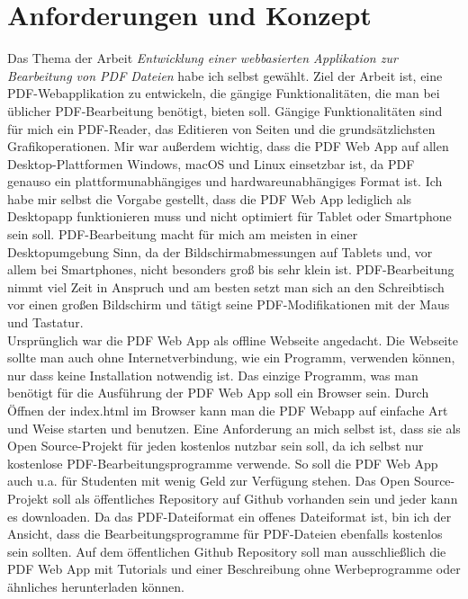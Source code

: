 \chapter{Anforderungen und Konzept}
Das Thema der Arbeit \textit{\glqq Entwicklung einer webbasierten Applikation zur Bearbeitung von PDF Dateien\grqq} habe ich selbst gewählt. Ziel der Arbeit ist, eine PDF-Webapplikation zu entwickeln, die gängige Funktionalitäten, die man bei üblicher PDF-Bearbeitung benötigt, bieten soll. Gängige Funktionalitäten sind für mich ein PDF-Reader, das Editieren von Seiten und die grundsätzlichsten Grafikoperationen. Mir war außerdem wichtig, dass die PDF Web App auf allen Desktop-Plattformen Windows, macOS und Linux einsetzbar ist, da PDF genauso ein plattformunabhängiges und hardwareunabhängiges Format ist. Ich habe mir selbst die Vorgabe gestellt, dass die PDF Web App lediglich als Desktopapp funktionieren muss und nicht optimiert für Tablet oder Smartphone sein soll. PDF-Bearbeitung macht für mich am meisten in einer Desktopumgebung Sinn, da der Bildschirmabmessungen auf Tablets und, vor allem bei Smartphones, nicht besonders groß bis sehr klein ist. PDF-Bearbeitung nimmt viel Zeit in Anspruch und am besten setzt man sich an den Schreibtisch vor einen großen Bildschirm und tätigt seine PDF-Modifikationen mit der Maus und Tastatur. \\
Ursprünglich war die PDF Web App als offline Webseite angedacht. Die Webseite sollte man auch ohne Internetverbindung, wie ein Programm, verwenden können, nur dass keine Installation notwendig ist. Das einzige Programm, was man benötigt für die Ausführung der PDF Web App soll ein Browser sein. Durch Öffnen der index.html im Browser kann man die PDF Webapp auf einfache Art und Weise starten und benutzen. Eine Anforderung an mich selbst ist, dass sie als Open Source-Projekt für jeden kostenlos nutzbar sein soll, da ich selbst nur kostenlose PDF-Bearbeitungsprogramme verwende. So soll die PDF Web App auch u.a. für Studenten mit wenig Geld zur Verfügung stehen. Das Open Source-Projekt soll als öffentliches Repository auf Github vorhanden sein und jeder kann es downloaden. Da das PDF-Dateiformat ein offenes Dateiformat ist, bin ich der Ansicht, dass die Bearbeitungsprogramme für PDF-Dateien ebenfalls kostenlos sein sollten. Auf dem öffentlichen Github Repository soll man ausschließlich die PDF Web App mit Tutorials und einer Beschreibung ohne Werbeprogramme oder ähnliches herunterladen können. \\
